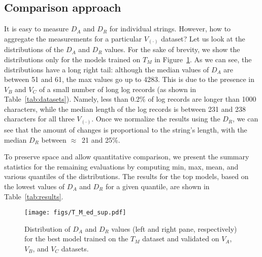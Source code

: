 \documentclass{article}
\begin{document}
\subsection{Comparison approach}
It is easy to measure $D_A$ and $D_R$ for individual strings. However, how to aggregate the measurements for a particular $V_{(\cdot)}$ dataset? Let us look at the distributions of the $D_A$ and $D_R$ values. For the sake of brevity, we show the distributions only for the models trained on $T_M$ in Figure~\ref{fig:distr}. As we can see, the distributions have a long right tail: although the median values of $D_A$ are between 51 and 61, the max values go up to 4283. This is due to the presence in $V_B$ and $V_C$ of a small number of long log records (as shown in Table~\ref{tab:datasets}). Namely, less than  0.2\% of log records are longer than 1000 characters, while the median length of the log records is between 231 and 238 characters for all three $V_{(\cdot)}$. 
Once we normalize the results using the  $D_R$, we can see that the amount of changes is proportional to the string’s length, with the median $D_R$ between $\approx$~21 and 25\%.

To preserve space and allow quantitative comparison, we present the summary statistics for the remaining evaluations by computing min, max, mean, and various quantiles of the distributions. The results for the top models, based on the lowest values of $D_A$ and $D_R$ for a given quantile, are shown in Table~\ref{tab:results}.

\begin{figure}[bt]
    \centering
    \texttt{[image: figs/T\_M\_ed\_sup.pdf]}
    \caption{Distribution of $D_A$ and $D_R$ values (left and right pane, respectively) for the best model trained on the $T_M$ dataset and validated on $V_A$, $V_B$, and $V_C$ datasets.}
    \label{fig:distr}
\end{figure}
\end{document}
